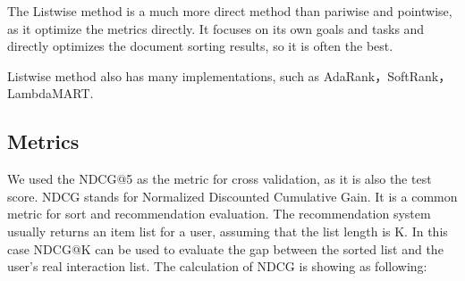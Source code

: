 \documentclass[runningheads]{llncs}
\begin{document}
The Listwise method is a much more direct method than pariwise and pointwise, as it optimize the metrics directly. It focuses on its own goals and tasks and directly optimizes the document sorting results, so it is often the best.

Listwise method also has many implementations, such as AdaRank，SoftRank，LambdaMART.

\subsection{Metrics}

We used the NDCG@5 as the metric for cross validation, as it is also the test score.
NDCG stands for Normalized Discounted Cumulative Gain. It is a common metric for sort and recommendation evaluation. The recommendation system usually returns an item list for a user, assuming that the list length is K. In this case NDCG@K can be used to evaluate the gap between the sorted list and the user's real interaction list. The calculation of NDCG is showing as following:
\end{document}
